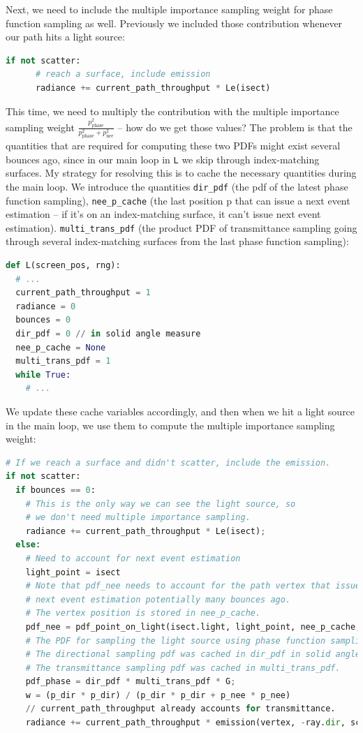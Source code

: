 Next, we need to include the multiple importance sampling weight for phase function sampling as well. Previously we included those contribution whenever our path hits a light source:
\begin{lstlisting}[language=python]
    if not scatter:
      # reach a surface, include emission
      radiance += current_path_throughput * Le(isect)
\end{lstlisting}

This time, we need to multiply the contribution with the multiple importance sampling weight $\frac{p_{\text{phase}}^2}{p_{\text{phase}}^2 + p_{\text{nee}}^2}$ -- how do we get those values? The problem is that the quantities that are required for computing these two PDFs might exist several bounces ago, since in our main loop in \lstinline{L} we skip through index-matching surfaces. My strategy for resolving this is to cache the necessary quantities during the main loop. We introduce the quantities \lstinline{dir_pdf} (the pdf of the latest phase function sampling), \lstinline{nee_p_cache} (the last position p that can issue a next event estimation -- if it's on an index-matching surface, it can't issue next event estimation). \lstinline{multi_trans_pdf} (the product PDF of transmittance sampling going through several index-matching surfaces from the last phase function sampling):
\begin{lstlisting}[language=python]
def L(screen_pos, rng):
  # ...
  current_path_throughput = 1
  radiance = 0
  bounces = 0
  dir_pdf = 0 // in solid angle measure
  nee_p_cache = None
  multi_trans_pdf = 1
  while True:
    # ...
\end{lstlisting}

We update these cache variables accordingly, and then when we hit a light source in the main loop, we use them to
compute the multiple importance sampling weight:
\begin{lstlisting}[language=python]
# If we reach a surface and didn't scatter, include the emission.
if not scatter:
  if bounces == 0:
    # This is the only way we can see the light source, so
    # we don't need multiple importance sampling.
    radiance += current_path_throughput * Le(isect);
  else:
    # Need to account for next event estimation
    light_point = isect
    # Note that pdf_nee needs to account for the path vertex that issued
    # next event estimation potentially many bounces ago.
    # The vertex position is stored in nee_p_cache.
    pdf_nee = pdf_point_on_light(isect.light, light_point, nee_p_cache, scene)
    # The PDF for sampling the light source using phase function sampling + transmittance sampling
    # The directional sampling pdf was cached in dir_pdf in solid angle measure.
    # The transmittance sampling pdf was cached in multi_trans_pdf.
    pdf_phase = dir_pdf * multi_trans_pdf * G;
    w = (p_dir * p_dir) / (p_dir * p_dir + p_nee * p_nee)
    // current_path_throughput already accounts for transmittance.
    radiance += current_path_throughput * emission(vertex, -ray.dir, scene) * w
\end{lstlisting}

